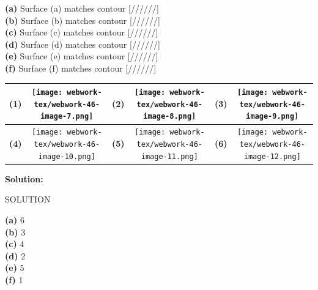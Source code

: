 \documentclass[10pt,]{book}
\theoremstyle{plain}
\theoremstyle{definition}
\theoremstyle{definition}
\theoremstyle{definition}
\theoremstyle{definition}
\theoremstyle{definition}
\numberwithin{equation}{section}
\begin{document}
\begin{exerciselist}
\begin{mdframed}
{\begin{center}
\end{center} 
\par 
{\bf (a)} Surface (a) matches contour [//////]
\leavevmode\\\relax 
{\bf (b)} Surface (b) matches contour [//////]
\leavevmode\\\relax 
{\bf (c)} Surface (c) matches contour [//////]
\leavevmode\\\relax 
{\bf (d)} Surface (d) matches contour [//////]
\leavevmode\\\relax 
{\bf (e)} Surface (e) matches contour [//////]
\leavevmode\\\relax 
{\bf (f)} Surface (f) matches contour [//////]
\par 
\begin{center} 

\par\smallskip\begin{center}\begin{tabular}{|c|c|c|c|c|c|} \hline

{\bf (1)} &\texttt{[image: webwork-tex/webwork-46-image-7.png]}
 &{\bf (2)} &\texttt{[image: webwork-tex/webwork-46-image-8.png]}
 &{\bf (3)} &\texttt{[image: webwork-tex/webwork-46-image-9.png]}
 \\ \hline 

{\bf (4)} &\texttt{[image: webwork-tex/webwork-46-image-10.png]}
 &{\bf (5)} &\texttt{[image: webwork-tex/webwork-46-image-11.png]}
 &{\bf (6)} &\texttt{[image: webwork-tex/webwork-46-image-12.png]}
 \\ \hline 


\end {tabular}\end{center}\par\smallskip

\end{center} 




\par \par {\bf Solution: }\par  SOLUTION \par 

{\bf (a)} 6
\leavevmode\\\relax 
{\bf (b)} 3
\leavevmode\\\relax 
{\bf (c)} 4
\leavevmode\\\relax 
{\bf (d)} 2
\leavevmode\\\relax 
{\bf (e)} 5
\leavevmode\\\relax 
{\bf (f)} 1
\leavevmode\\\relax 


}
\end{mdframed}
\end{exerciselist}
\end{document}

